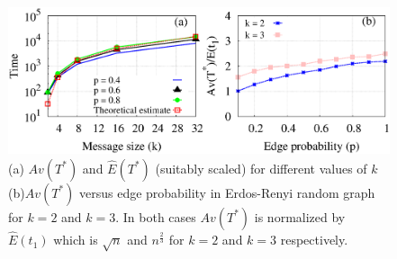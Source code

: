\begin{figure}[htpb]
\centering
  \includegraphics[scale=0.4]{./texfiles/Chapter_3/epl/figs1/ER_graph_result.eps}
  
  \caption{\label{fig_diff_g_n_p}(a) $Av(T^{\ast})$ and $\hat E(T^{\ast})$ (suitably scaled) for different values of $k$ 
  (b)$Av(T^{\ast})$ versus edge probability in Erdos-Renyi random graph for $k=2$ and $k=3$. In both cases $Av(T^{\ast})$ is normalized by $\hat{E}(t_{1})$ which is $\sqrt{n}$ and $n^{\frac{2}{3}}$ for $k=2$ and $k=3$ respectively.
  \vspace{5mm}}
 \end{figure}


\medskip
